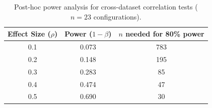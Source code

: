 \begin{table}[h]
\centering
\caption{Post-hoc power analysis for cross-dataset correlation tests ($n=23$ configurations).}
\label{tab:power_analysis}
\begin{tabular}{ccc}
\toprule
Effect Size ($\rho$) & Power ($1-\beta$) & $n$ needed for 80\% power \\
\midrule
0.1 & 0.073 & 783 \\
0.2 & 0.148 & 195 \\
0.3 & 0.283 & 85 \\
0.4 & 0.474 & 47 \\
0.5 & 0.690 & 30 \\
\bottomrule
\end{tabular}
\end{table}
